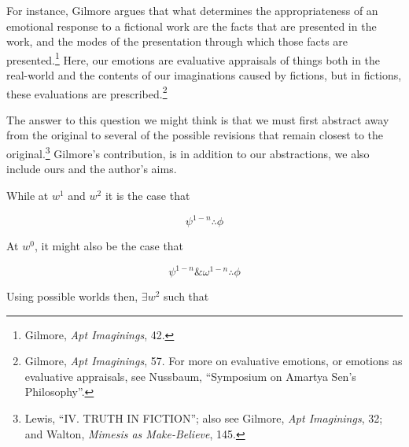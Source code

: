 \documentclass[
  12pt,
]{book}
\theoremstyle{definition}
\theoremstyle{definition}
\theoremstyle{definition}
\theoremstyle{definition}
\theoremstyle{remark}
\begin{document}
For instance, Gilmore argues that what determines the appropriateness of an emotional response to a fictional work are the facts that are presented in the work, and the modes of the presentation through which those facts are presented.\footnote{Gilmore, \emph{Apt {Imaginings}}, 42.} Here, our emotions are evaluative appraisals of things both in the real-world and the contents of our imaginations caused by fictions, but in fictions, these evaluations are prescribed.\footnote{Gilmore, \emph{Apt {Imaginings}}, 57. For more on evaluative emotions, or emotions as evaluative appraisals, see Nussbaum, {``Symposium on {Amartya Sen}'s Philosophy''}.}

\noindent The answer to this question we might think is that we must first abstract away from the original to several of the possible revisions that remain closest to the original.\footnote{Lewis, {``{IV}. {TRUTH IN FICTION}''}; also see Gilmore, \emph{Apt {Imaginings}}, 32; and Walton, \emph{Mimesis as {Make-Believe}}, 145.} Gilmore's contribution, is in addition to our abstractions, we also include ours and the author's aims.

While at \(w^{1}\) and \(w^{2}\) it is the case that

\[\psi^{1-n}\therefore\phi\]

\noindent At \(w^{0}\), it might also be the case that

\[\psi^{1-n}\&\omega^{1-n}\therefore\phi\]

\newpage

\noindent Using possible worlds then, \(\exists w^{2}\) such that
\end{document}
